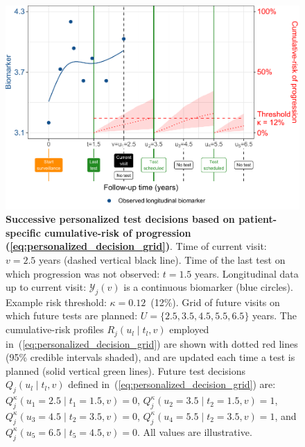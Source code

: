 \begin{figure}
\centerline{\includegraphics{images/schedule_explanation_102.pdf}}
\caption{\small{\textbf{Successive personalized test decisions based on patient-specific cumulative-risk of progression (\ref{eq:personalized_decision_grid})}. Time of current visit: $v=2.5$ years (dashed vertical black line). Time of the last test on which progression was not observed: $t=1.5$ years. Longitudinal data up to current visit: $\mathcal{Y}_j(v)$ is a continuous biomarker (blue circles). Example risk threshold: $\kappa=0.12$~(12\%). Grid of future visits on which future tests are planned: $U = \{2.5, 3.5, 4.5, 5.5, 6.5\}$ years. The cumulative-risk profiles $R_j(u_l \mid t_l, v)$ employed in~(\ref{eq:personalized_decision_grid}) are shown with dotted red lines (95\% credible intervals shaded), and are updated each time a test is planned (solid vertical green lines). Future test decisions $Q_j(u_l \mid t_l, v)$ defined in~(\ref{eq:personalized_decision_grid}) are: $Q_j^\kappa(u_1=2.5\mid t_1=1.5,v)=0$, $Q_j^\kappa(u_2=3.5\mid t_2=1.5,v)=1$, $Q_j^\kappa(u_3=4.5\mid t_2=3.5,v)=0$, $Q_j^\kappa(u_4=5.5\mid t_2=3.5,v)=1$, and $Q_j^\kappa(u_5=6.5\mid t_5=4.5,v)=0$. All values are illustrative.}}
\label{fig:schedule_explanation}
\end{figure}


